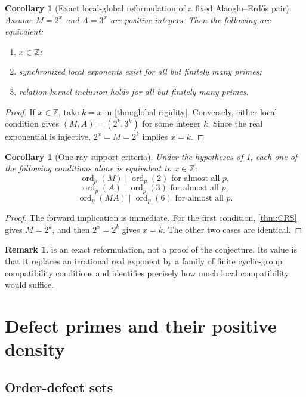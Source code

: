 \documentclass[11pt]{article}
\newtheorem{corollary}[theorem]{Corollary}
\theoremstyle{definition}
\newtheorem{remark}[theorem]{Remark}
\newcommand{\Z}{\mathbb Z}
\newcommand{\ord}{\operatorname{ord}}
\newcommand{\AEname}{Alaoglu--Erd\H{o}s}
\begin{document}
\begin{corollary}[Exact local-global reformulation of a fixed \AEname{} pair]
\label{cor:AE-localglobal}
Assume $M=2^x$ and $A=3^x$ are positive integers.  Then the following are equivalent:
\begin{enumerate}[label=(\roman*)]
\item $x\in\Z$;
\item synchronized local exponents exist for all but finitely many primes;
\item relation-kernel inclusion holds for all but finitely many primes.
\end{enumerate}
\end{corollary}

\begin{proof}
If $x\in\Z$, take $k=x$ in \cref{thm:global-rigidity}.  Conversely, either local condition
gives $(M,A)=(2^k,3^k)$ for some integer $k$.  Since the real exponential is injective,
$2^x=M=2^k$ implies $x=k$.
\end{proof}

\begin{corollary}[One-ray support criteria]
\label{cor:one-ray}
Under the hypotheses of \cref{cor:AE-localglobal}, each one of the following conditions alone
is equivalent to $x\in\Z$:
\[
 \ord_p(M)\mid\ord_p(2)\text{ for almost all }p,
\]
\[
 \ord_p(A)\mid\ord_p(3)\text{ for almost all }p,
\]
\[
 \ord_p(MA)\mid\ord_p(6)\text{ for almost all }p.
\]
\end{corollary}

\begin{proof}
The forward implication is immediate.  For the first condition, \cref{thm:CRS} gives
$M=2^k$, and then $2^x=2^k$ gives $x=k$.  The other two cases are identical.
\end{proof}

\begin{remark}
 is an exact reformulation, not a proof of the conjecture.  Its value
is that it replaces an irrational real exponent by a family of finite cyclic-group
compatibility conditions and identifies precisely how much local compatibility would suffice.
\end{remark}

\section{Defect primes and their positive density}
\label{sec:defects}

\subsection{Order-defect sets}
\end{document}
